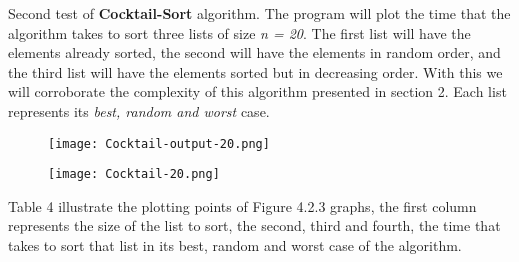 {\bfseries\itshape\color{carmine}{Observation:}} {\itshape{}}

\pagebreak

Second test of {\bfseries Cocktail-Sort} algorithm. The program will plot the time that the algorithm takes to sort three lists of size {\itshape n = 20}. The first list will have the elements already sorted, the second will have the elements in random order, and the third list will have the elements sorted but in decreasing order. With this we will corroborate the complexity of this algorithm presented in section 2. Each list represents its {\itshape best, random and worst} case. \hfill \break

\begin{figure}[H]
\texttt{[image: Cocktail-output-20.png]}
\centering \linebreak {}
\end{figure}

\begin{figure}[H]
\texttt{[image: Cocktail-20.png]}
\centering \linebreak {}
\end{figure} \pagebreak

Table 4 illustrate the plotting points of Figure 4.2.3 graphs, the first column represents the size of the list to sort, the second, third and fourth, the time that takes to sort that list in its best, random and worst case of the algorithm. \hfill \break

